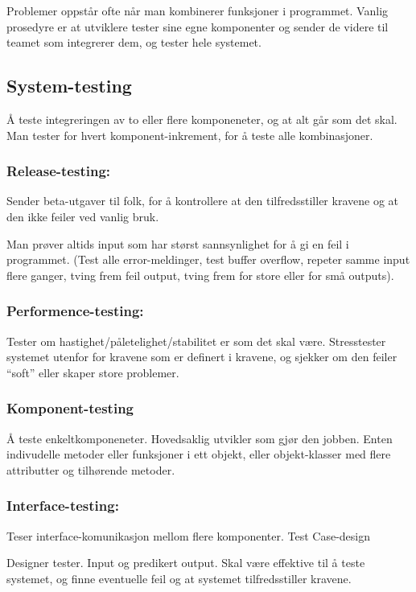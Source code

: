 \documentclass[11pt]{article}
\begin{document}
   Problemer oppstår ofte når man kombinerer funksjoner i programmet.
   Vanlig prosedyre er at utviklere tester sine egne komponenter og sender de videre til teamet som integrerer dem, og tester hele systemet.
\subsection{System-testing}
\label{sec-9.2}


   Å teste integreringen av to eller flere komponeneter, og at alt går som det skal.
   Man tester for hvert komponent-inkrement, for å teste alle kombinasjoner.
\subsubsection{Release-testing:}
\label{sec-9.2.1}

    Sender beta-utgaver til folk, for å kontrollere at den tilfredsstiller kravene og at den ikke feiler ved vanlig bruk.

    Man prøver altids input som har størst sannsynlighet for å gi en feil i programmet. (Test alle error-meldinger, test buffer overflow, repeter samme input flere ganger, tving frem feil output, tving frem for store eller for små outputs).
\subsubsection{Performence-testing:}
\label{sec-9.2.2}

    Tester om hastighet/påletelighet/stabilitet er som det skal være. 
    Stresstester systemet utenfor for kravene som er definert i kravene, 
    og sjekker om den feiler ``soft'' eller skaper store problemer. 
\subsubsection{Komponent-testing}
\label{sec-9.2.3}


    Å teste enkeltkomponeneter. Hovedsaklig utvikler som gjør den jobben. 
    Enten indivudelle metoder eller funksjoner i ett objekt, eller objekt-klasser 
    med flere attributter og tilhørende metoder.
\subsubsection{Interface-testing:}
\label{sec-9.2.4}

    Teser interface-komunikasjon mellom flere komponenter.
    Test Case-design

    Designer tester. Input og predikert output. Skal være effektive til å teste systemet, og finne eventuelle feil og at systemet tilfredsstiller kravene.
\end{document}

